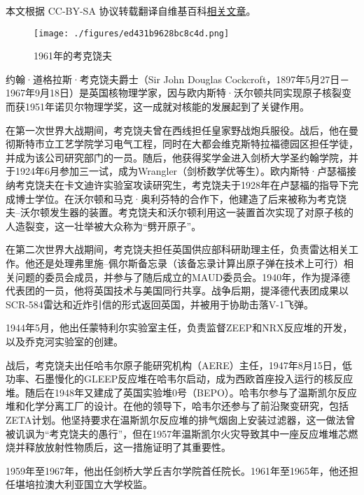 
本文根据 CC-BY-SA 协议转载翻译自维基百科\href{https://en.wikipedia.org/wiki/John_Cockcroft}{相关文章}。

\begin{figure}[ht]
\centering
\texttt{[image: ./figures/ed431b9628bc8c4d.png]}
\caption{1961年的考克饶夫} \label{fig_YHkrf_1}
\end{figure}
约翰·道格拉斯·考克饶夫爵士（Sir John Douglas Cockcroft，1897年5月27日－1967年9月18日）是英国核物理学家，因与欧内斯特·沃尔顿共同实现原子核裂变而获1951年诺贝尔物理学奖，这一成就对核能的发展起到了关键作用。

在第一次世界大战期间，考克饶夫曾在西线担任皇家野战炮兵服役。战后，他在曼彻斯特市立工艺学院学习电气工程，同时在大都会维克斯特拉福德园区担任学徒，并成为该公司研究部门的一员。随后，他获得奖学金进入剑桥大学圣约翰学院，并于1924年6月参加三一试，成为Wrangler（剑桥数学优等生）。欧内斯特·卢瑟福接纳考克饶夫在卡文迪许实验室攻读研究生，考克饶夫于1928年在卢瑟福的指导下完成博士学位。在沃尔顿和马克·奥利芬特的合作下，他建造了后来被称为考克饶夫–沃尔顿发生器的装置。考克饶夫和沃尔顿利用这一装置首次实现了对原子核的人造裂变，这一壮举被大众称为“劈开原子”。

在第二次世界大战期间，考克饶夫担任英国供应部科研助理主任，负责雷达相关工作。他还是处理弗里施–佩尔斯备忘录（该备忘录计算出原子弹在技术上可行）相关问题的委员会成员，并参与了随后成立的MAUD委员会。1940年，作为提泽德代表团的一员，他将英国技术与美国同行共享。战争后期，提泽德代表团成果以SCR-584雷达和近炸引信的形式返回英国，并被用于协助击落V-1飞弹。

1944年5月，他出任蒙特利尔实验室主任，负责监督ZEEP和NRX反应堆的开发，以及乔克河实验室的创建。

战后，考克饶夫出任哈韦尔原子能研究机构（AERE）主任，1947年8月15日，低功率、石墨慢化的GLEEP反应堆在哈韦尔启动，成为西欧首座投入运行的核反应堆。随后在1948年又建成了英国实验堆0号（BEPO）。哈韦尔参与了温斯凯尔反应堆和化学分离工厂的设计。在他的领导下，哈韦尔还参与了前沿聚变研究，包括ZETA计划。他坚持要求在温斯凯尔反应堆的排气烟囱上安装过滤器，这一做法曾被讥讽为“考克饶夫的愚行”，但在1957年温斯凯尔火灾导致其中一座反应堆堆芯燃烧并释放放射性物质后，这一措施证明了其重要性。

1959年至1967年，他出任剑桥大学丘吉尔学院首任院长。1961年至1965年，他还担任堪培拉澳大利亚国立大学校监。
